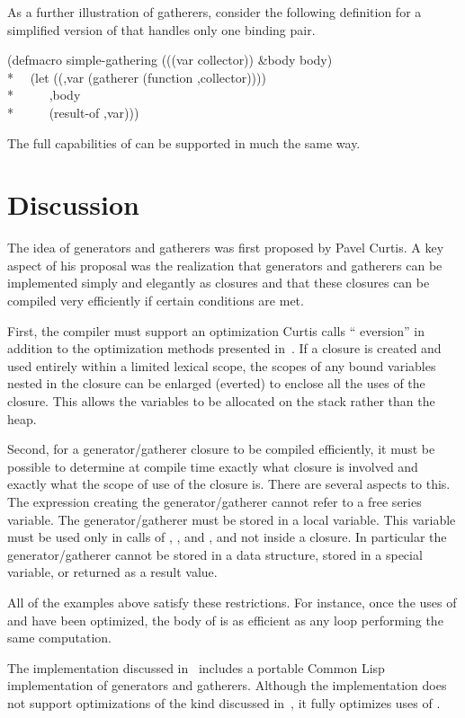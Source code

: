 \begin{new}
\begin{defmac}
As a further illustration of gatherers, consider the following definition for a
simplified version of  that handles only one binding pair.
\begin{lisp}
(defmacro simple-gathering (((var collector)) \&body body) \\*
~~{\Xbq}(let ((,var (gatherer (function ,collector)))) \\*
~~~~~,{\Xatsign}body \\*
~~~~~(result-of ,var)))
\end{lisp}
The full capabilities of 
 can be supported in much the same way.
\end{defmac}

\section{Discussion}

The idea of generators and gatherers was first proposed by Pavel
Curtis.  A key aspect of his proposal was the realization that
generators and gatherers can be implemented simply and elegantly as
closures and that these closures can be compiled very
efficiently if certain conditions are met.

First, the compiler must support an optimization Curtis calls
`` eversion'' in addition to the optimization methods presented
in~\cite{RABBIT}.  If a closure is created and used entirely within a
limited lexical scope, the scopes of any bound variables nested in the
closure can be enlarged (everted) to enclose all the uses of the
closure.  This allows the variables to be allocated on the stack
rather than the heap.

Second, for a generator/gatherer closure to be compiled efficiently,
it must be possible to determine at compile time exactly what closure
is involved and exactly what the scope of use of the closure is.
There are several aspects to this.  The expression creating the
generator/gatherer cannot refer to a free series variable.  The
generator/gatherer must be stored in a local variable.  This
variable must be used only in calls of , 
, and , and not inside a closure.  In
particular the generator/gatherer cannot be stored in a data
structure, stored in a special variable, or returned as a result
value.

All of the examples above satisfy these restrictions.  For instance,
once the uses of  and  have been
optimized, the body of  is as efficient as any loop
performing the same computation.

The implementation discussed in~\cite{WATERS-SERIES-DESIGN} includes a
portable Common Lisp implementation of generators and gatherers.  Although
the implementation does not support optimizations of the kind discussed
in~\cite{RABBIT}, it fully optimizes uses of .
\end{new}
